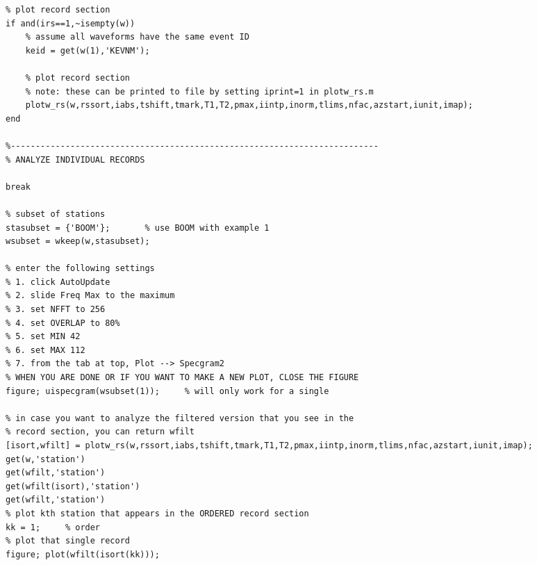 \documentclass[11pt,titlepage,fleqn]{article}
\begin{document}
\begin{spacing}{1.0}
\begin{verbatim}
% plot record section
if and(irs==1,~isempty(w))
    % assume all waveforms have the same event ID
    keid = get(w(1),'KEVNM');

    % plot record section
    % note: these can be printed to file by setting iprint=1 in plotw_rs.m
    plotw_rs(w,rssort,iabs,tshift,tmark,T1,T2,pmax,iintp,inorm,tlims,nfac,azstart,iunit,imap);
end

%--------------------------------------------------------------------------
% ANALYZE INDIVIDUAL RECORDS

break

% subset of stations
stasubset = {'BOOM'};       % use BOOM with example 1
wsubset = wkeep(w,stasubset);

% enter the following settings
% 1. click AutoUpdate
% 2. slide Freq Max to the maximum
% 3. set NFFT to 256
% 4. set OVERLAP to 80%
% 5. set MIN 42
% 6. set MAX 112
% 7. from the tab at top, Plot --> Specgram2
% WHEN YOU ARE DONE OR IF YOU WANT TO MAKE A NEW PLOT, CLOSE THE FIGURE
figure; uispecgram(wsubset(1));     % will only work for a single 

% in case you want to analyze the filtered version that you see in the
% record section, you can return wfilt
[isort,wfilt] = plotw_rs(w,rssort,iabs,tshift,tmark,T1,T2,pmax,iintp,inorm,tlims,nfac,azstart,iunit,imap);
get(w,'station')
get(wfilt,'station')
get(wfilt(isort),'station')
get(wfilt,'station')
% plot kth station that appears in the ORDERED record section
kk = 1;     % order 
% plot that single record
figure; plot(wfilt(isort(kk)));
\end{verbatim}
\end{spacing}

\end{document}
